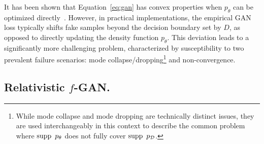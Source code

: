 It has been shown that Equation~\ref{eq:gan} has convex properties when $p_\theta$ can be optimized directly~\cite{gan,rpgan}. However, in practical implementations, the empirical GAN loss typically shifts fake samples beyond the decision boundary set by $D$, as opposed to directly updating the density function $p_\theta$. This deviation leads to a significantly more challenging problem, characterized by susceptibility to two prevalent failure scenarios: mode collapse/dropping\footnote{While mode collapse and mode dropping are technically distinct issues, they are used interchangeably in this context to describe the common problem where $\supp\ p_\theta$ does not fully cover $\supp\ p_\mathcal{D}$.} and non-convergence.

\vspace{-1ex}
\subsection{Relativistic \texorpdfstring{$f$-GAN}{f-GAN}.}
\vspace{-1ex}

